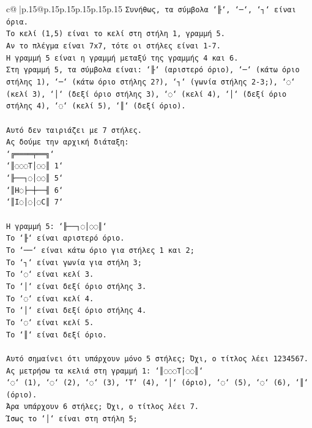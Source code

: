 \documentclass{article}
\begin{document}
{\begin{supertabular}{c@{$\;$}|p{.15\linewidth}@{}p{.15\linewidth}p{.15\linewidth}p{.15\linewidth}p{.15\linewidth}p{.15\linewidth}}
{{{\texttt{Συνήθως, τα σύμβολα `╟`, `─`, `┐` είναι όρια.} \\
\texttt{Το κελί (1,5) είναι το κελί στη στήλη 1, γραμμή 5.} \\
\texttt{Αν το πλέγμα είναι 7x7, τότε οι στήλες είναι 1{-}7.} \\
\texttt{Η γραμμή 5 είναι η γραμμή μεταξύ της γραμμής 4 και 6.} \\
\texttt{Στη γραμμή 5, τα σύμβολα είναι: `╟` (αριστερό όριο), `─` (κάτω όριο στήλης 1), `─` (κάτω όριο στήλης 2?), `┐` (γωνία στήλης 2{-}3;), `◌` (κελί 3), `│` (δεξί όριο στήλης 3), `◌` (κελί 4), `│` (δεξί όριο στήλης 4), `◌` (κελί 5), `║` (δεξί όριο).} \\
\\ 
\texttt{Αυτό δεν ταιριάζει με 7 στήλες.} \\
\texttt{Ας δούμε την αρχική διάταξη:} \\
\texttt{`╔════╤══╗`} \\
\texttt{`║◌◌◌T│◌◌║ 1`} \\
\texttt{`╟──┐◌│◌◌║ 5`} \\
\texttt{`║H◌├─┼──╢ 6`} \\
\texttt{`║I◌│◌│◌C║ 7`} \\
\\ 
\texttt{Η γραμμή 5: `╟──┐◌│◌◌║`} \\
\texttt{Το `╟` είναι αριστερό όριο.} \\
\texttt{Το `──` είναι κάτω όριο για στήλες 1 και 2;} \\
\texttt{Το `┐` είναι γωνία για στήλη 3;} \\
\texttt{Το `◌` είναι κελί 3.} \\
\texttt{Το `│` είναι δεξί όριο στήλης 3.} \\
\texttt{Το `◌` είναι κελί 4.} \\
\texttt{Το `│` είναι δεξί όριο στήλης 4.} \\
\texttt{Το `◌` είναι κελί 5.} \\
\texttt{Το `║` είναι δεξί όριο.} \\
\\ 
\texttt{Αυτό σημαίνει ότι υπάρχουν μόνο 5 στήλες; Όχι, ο τίτλος λέει 1234567.} \\
\texttt{Ας μετρήσω τα κελιά στη γραμμή 1: `║◌◌◌T│◌◌║`} \\
\texttt{`◌` (1), `◌` (2), `◌` (3), `T` (4), `│` (όριο), `◌` (5), `◌` (6), `║` (όριο).} \\
\texttt{Άρα υπάρχουν 6 στήλες; Όχι, ο τίτλος λέει 7.} \\
\texttt{Ίσως το `│` είναι στη στήλη 5;} \\
}}}
\end{supertabular}}
\end{document}

